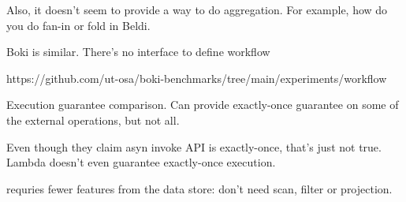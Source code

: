 Also, it doesn't seem to provide a way to do aggregation. For example, how do
you do fan-in or fold in Beldi.

Boki is similar. There's no interface to define workflow

https://github.com/ut-osa/boki-benchmarks/tree/main/experiments/workflow

Execution guarantee comparison. Can provide exactly-once guarantee on some of
the external operations, but not all.

Even though they claim asyn invoke API is exactly-once, that's just not true.
Lambda doesn't even guarantee exactly-once execution.

\name{} requries fewer features from the data store: don't need scan, filter
or projection.





 



